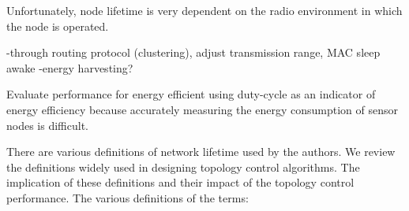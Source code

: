 
Unfortunately, node lifetime is very dependent on the radio environment in which the node is operated. \cite{alexlifetime}

-through routing protocol (clustering), adjust transmission range, MAC sleep awake 
-energy harvesting?

Evaluate performance for energy efficient using duty-cycle as an indicator of energy efficiency because accurately measuring the energy consumption of sensor nodes is difficult. \cite{y-mac}



There are various definitions of network lifetime used by the authors. We review the definitions widely used in designing topology control algorithms. The implication of these definitions and their impact of the topology control performance. The various definitions of the terms:



